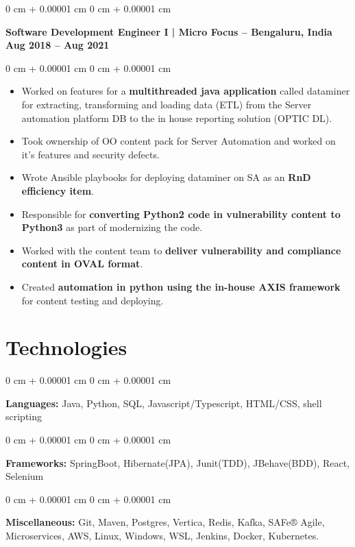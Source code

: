 \documentclass[10pt, letterpaper]{article}
\newenvironment{highlights}{
    \begin{itemize}[
        topsep=0.10 cm,
        parsep=0.10 cm,
        partopsep=0pt,
        itemsep=0pt,
        leftmargin=0 cm + 10pt
    ]
}{
    \end{itemize}
} %
\newenvironment{onecolentry}{
    \begin{adjustwidth}{
        0 cm + 0.00001 cm
    }{
        0 cm + 0.00001 cm
    }
}{
    \end{adjustwidth}
} %
\newenvironment{twocolentry}[2][]{
    \onecolentry
    \def\secondColumn{#2}
    \setcolumnwidth{\fill, 4.5 cm}
    \begin{paracol}{2}
}{
    \switchcolumn \raggedleft \secondColumn
    \end{paracol}
    \endonecolentry
} %
\begin{document}
        \vspace{0.5 cm}

        \begin{twocolentry}{
            \textbf{Aug 2018 – Aug 2021}
        }
            {\textbf{{\color{MidnightBlue}Software Development Engineer I} |  Micro Focus -- Bengaluru, India}}\end{twocolentry}
        \vspace{0.20 cm}
         \begin{onecolentry}
            \begin{highlights}
                \item Worked on features for a \textbf{multithreaded java application} called dataminer for extracting, transforming and loading data (ETL) from the Server automation platform DB to the in house reporting solution (OPTIC DL).
                \item Took ownership of OO content pack for Server Automation and worked on it's features and security defects.
                \item Wrote Ansible playbooks for deploying dataminer on SA as an \textbf{RnD efficiency item}.
                \item Responsible for \textbf{converting Python2 code in vulnerability content to Python3} as part of modernizing the code.
                \item Worked with the content team to \textbf{deliver vulnerability and compliance content in OVAL format}.
                \item Created \textbf{automation in python using the in-house AXIS framework} for content testing and deploying.
            \end{highlights}
        \end{onecolentry}

    \section{Technologies}    
        \begin{onecolentry}
            \textbf{Languages:} Java, Python, SQL, Javascript/Typescript, HTML/CSS, shell scripting
        \end{onecolentry}
        \begin{onecolentry}
            \textbf{Frameworks:} SpringBoot, Hibernate(JPA), Junit(TDD), JBehave(BDD), React, Selenium
        \end{onecolentry}
        \begin{onecolentry}
            \textbf{Miscellaneous:} Git, Maven, Postgres, Vertica, Redis, Kafka, SAFe® Agile, Microservices, AWS, Linux, Windows, WSL, Jenkins, Docker, Kubernetes.
        \end{onecolentry}
\end{document}
